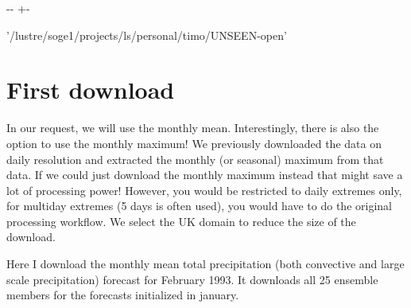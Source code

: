 \documentclass[letterpaper,10pt,english]{sphinxmanual}
\newlength\nbsphinxcodecellspacing
\begin{document}
{

\kern-\sphinxverbatimsmallskipamount\kern-\baselineskip
\kern+\FrameHeightAdjust\kern-\fboxrule
\vspace{\nbsphinxcodecellspacing}

\begin{sphinxVerbatim}[commandchars=\\\{\}]
\llap{\color{nbsphinxout}[3]:\,\hspace{\fboxrule}\hspace{\fboxsep}}'/lustre/soge1/projects/ls/personal/timo/UNSEEN-open'
\end{sphinxVerbatim}
}


\section{First download}
\label{\detokenize{Notebooks/1.Download/1.Retrieve:First-download}}
In our request, we will use the monthly mean. Interestingly, there is also the option to use the monthly maximum! We previously downloaded the data on daily resolution and extracted the monthly (or seasonal) maximum from that data. If we could just download the monthly maximum instead that might save a lot of processing power! However, you would be restricted to daily extremes only, for multi\sphinxhyphen{}day extremes (5 days is often used), you would have to do the original processing workflow. We select
the UK domain to reduce the size of the download.

Here I download the monthly mean total precipitation (both convective and large scale precipitation) forecast for February 1993. It downloads all 25 ensemble members for the forecasts initialized in january.
\end{document}
